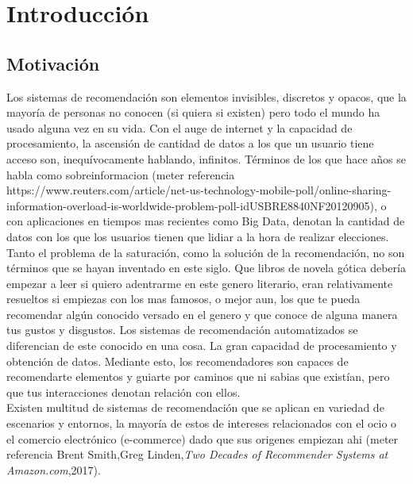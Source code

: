 \chapter{Introducción}
\label{cap:introduccion}


\section{Motivación}
Los sistemas de recomendación son elementos invisibles, discretos y opacos, que la mayoría de personas no conocen (si quiera si existen) pero todo el mundo ha usado alguna vez en su vida. Con el auge de internet y la capacidad de procesamiento, la ascensión de cantidad de datos a los que un usuario tiene acceso son, inequívocamente hablando, infinitos. Términos de los que hace años se habla como sobreinformacion (meter referencia https://www.reuters.com/article/net-us-technology-mobile-poll/online-sharing-information-overload-is-worldwide-problem-poll-idUSBRE8840NF20120905), o con aplicaciones en tiempos mas recientes como Big Data, denotan la cantidad de datos con los que los usuarios tienen que lidiar a la hora de realizar elecciones. \\

Tanto el problema de la saturación, como la solución de la recomendación, no son términos que se hayan inventado en este siglo. Que libros de novela gótica debería empezar a leer si quiero adentrarme en este genero literario, eran relativamente resueltos si empiezas con los mas famosos, o mejor aun, los que te pueda recomendar algún conocido versado en el genero y que conoce de alguna manera tus gustos y disgustos. Los sistemas de recomendación automatizados se diferencian de este conocido en una cosa. La gran capacidad de procesamiento y obtención de datos.  Mediante esto, los recomendadores son capaces de recomendarte elementos y guiarte por caminos que ni sabias que existían, pero que tus interacciones denotan relación con ellos. \\

Existen multitud de sistemas de recomendación que se aplican en variedad de escenarios y entornos, la mayoría de estos de intereses relacionados con el ocio o el comercio electrónico (e-commerce) dado que sus origenes empiezan ahi (meter referencia Brent Smith,Greg Linden,\textit{Two Decades of Recommender Systems at Amazon.com},2017). 

